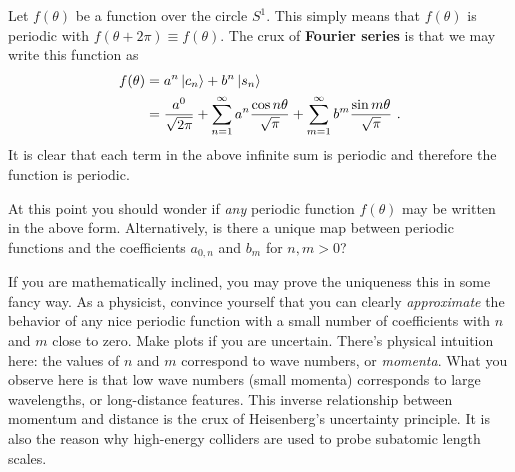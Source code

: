 Let $f(\theta)$ be a function over the circle $S^1$. This simply means that $f(\theta)$ is periodic with $f(\theta+2\pi) \equiv f(\theta)$. The crux of \textbf{Fourier series} is that we may write this function as
\begin{align}
    f(\theta) 
    &= a^n\left|c_n\right\rangle
    + 
    b^n \left|s_n\right\rangle
    \\
    &= 
    \frac{a^0}{\sqrt{2\pi}}
    +
    \sum_{n=1}^\infty a^n \frac{\cos n\theta}{\sqrt{\pi}}
    + \sum_{m=1}^\infty b^m \frac{\sin m\theta}{\sqrt{\pi}} \ .
    \label{eq:fourier:series:sine:cos}
\end{align}
It is clear that each term in the above infinite sum is periodic and therefore the function is periodic.
\begin{exercise}[Completeness?] 
At this point you should wonder if \emph{any} periodic function $f(\theta)$ may be written in the above form. Alternatively, is there a unique map between periodic functions and the coefficients $a_{0,n}$ and $b_m$ for $n,m>0$? 

If you are mathematically inclined, you may prove the uniqueness this in some fancy way. As a physicist, convince yourself that you can clearly \emph{approximate} the behavior of any nice periodic function with a small number of coefficients with $n$ and $m$ close to zero. Make plots if you are uncertain. There's physical intuition here: the values of $n$ and $m$ correspond to wave numbers, or \emph{momenta}. What you observe here is that low wave numbers (small momenta) corresponds to large wavelengths, or long-distance features. This inverse relationship between momentum and distance is the crux of Heisenberg's uncertainty principle. It is also the reason why high-energy colliders are used to probe subatomic length scales.
\end{exercise}

